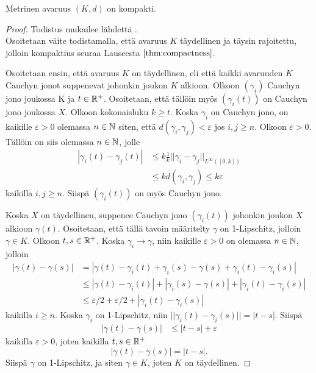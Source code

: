 \documentclass[12pt,oneside,a4paper]{amsbook} %
\begin{document}
\begin{theorem}\label{le:compactnessOfK}
    Metrinen avaruus $(K, d)$ on kompakti.
\end{theorem}
\begin{proof}
    Todistus mukailee lähdettä \cite[s.26]{optimal}. \\
    Osoitetaan väite todistamalla, että avaruus $K$ täydellinen ja täysin rajoitettu, jolloin kompaktius seuraa Lauseesta $\ref{thm:compactness}$.
    
    Osoitetaan ensin, että avaruus $K$ on täydellinen, eli että kaikki avaruuden $K$ Cauchyn jonot suppenevat johonkin joukon $K$ alkioon. Olkoon $(\gamma_i)$ Cauchyn jono joukossa K ja $t\in {\mathbb{R}^{+}}$. Osoitetaan, että tällöin myös $(\gamma_i(t))$ on Cauchyn jono joukossa $X$. Olkoon kokonaisluku $k \ge t$. Koska $\gamma_i$ on Cauchyn jono, on kaikille $\varepsilon > 0$ olemassa $n \in \mathbb{N}$ siten, että $d(\gamma_i, \gamma_j) < \varepsilon$ jos $i, j \ge n$. Olkoon $\varepsilon > 0$. Tällöin on siis olemassa $n \in \mathbb{N}$, jolle
    \begin{align*}
        |\gamma_i(t)-\gamma_j(t)| &\le k\frac{1}{k} ||\gamma_i - \gamma_j||_{L^\infty{([0,k])}} \\ 
        &\le k d(\gamma_i, \gamma_j) \le k\varepsilon
    \end{align*}
    kaikilla $i, j \ge n$. Siispä $(\gamma_i(t))$ on myös Cauchyn jono.
    
    Koska $X$ on täydellinen, suppenee Cauchyn jono $(\gamma_i(t))$ johonkin joukon $X$ alkioon $\gamma(t)$. Osoitetaan, että tällä tavoin määritelty $\gamma$ on 1-Lipschitz, jolloin $\gamma \in K$. Olkoon $t, s \in {\mathbb{R}^{+}}$. Koska $\gamma_i \to \gamma$, niin kaikille $\varepsilon > 0$ on olemassa $n\in \mathbb{N}$, jolloin
    \begin{align*}
        |\gamma(t) - \gamma(s)| &= |\gamma(t) - \gamma_i(t) + \gamma_i(s) - \gamma(s) + \gamma_i(t) - \gamma_i(s)| \\
        &\le  |\gamma(t) - \gamma_i(t)| + |\gamma_i(s) - \gamma(s)| + |\gamma_i(t) - \gamma_i(s)| \\
        &\le \varepsilon/2 + \varepsilon/2 + |\gamma_i(t) - \gamma_i(s)|
    \end{align*}
    kaikilla $i \ge n$. Koska $\gamma_i$ on 1-Lipschitz, niin $||\gamma_i(t) - \gamma_i(s)|| = |t-s|$. Siispä
    \begin{align*}
        |\gamma(t) - \gamma(s)| &\le |t-s| + \varepsilon
    \end{align*}
    kaikilla $\varepsilon > 0$, joten kaikilla $t,s \in {\mathbb{R}^{+}}$
    \begin{equation*}
        |\gamma(t)-\gamma(s)| = |t-s|.
    \end{equation*}
    Siispä $\gamma$ on 1-Lipschitz, ja siten $\gamma \in K$, joten $K$ on täydellinen.
    

\end{proof}
\end{document}
